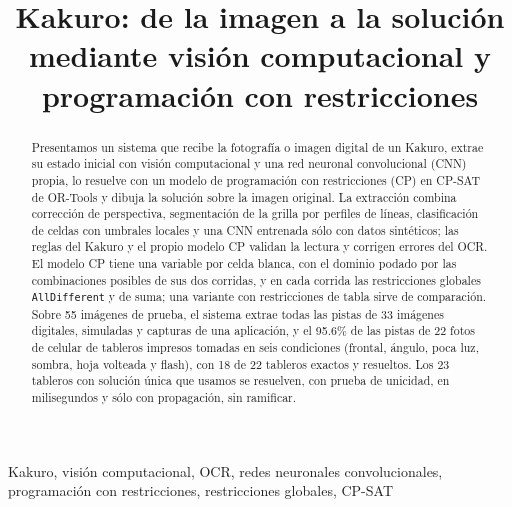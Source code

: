 \documentclass[conference,a4paper]{IEEEtran}
\begin{document}
\title{Kakuro: de la imagen a la solución mediante visión computacional y programación con restricciones}

\author{
}

\maketitle

\begin{abstract}
Presentamos un sistema que recibe la fotografía o imagen digital de un Kakuro, extrae su estado inicial con visión computacional
y una red neuronal convolucional (CNN) propia, lo resuelve con un modelo de programación con restricciones (CP) en CP-SAT de OR-Tools
y dibuja la solución sobre la imagen original. La extracción combina corrección de perspectiva, segmentación de la grilla por perfiles
de líneas, clasificación de celdas con umbrales locales y una CNN entrenada sólo con datos sintéticos; las reglas del Kakuro y el propio
modelo CP validan la lectura y corrigen errores del OCR. El modelo CP tiene una variable por celda blanca, con el dominio podado por las
combinaciones posibles de sus dos corridas, y en cada corrida las restricciones globales \texttt{AllDifferent} y de suma; una variante con
restricciones de tabla sirve de comparación. Sobre 55 imágenes de prueba, el sistema extrae todas las pistas de 33 imágenes digitales,
simuladas y capturas de una aplicación, y el 95.6\% de las pistas de 22 fotos de celular de tableros impresos tomadas en seis condiciones
(frontal, ángulo, poca luz, sombra, hoja volteada y flash), con 18 de 22 tableros exactos y resueltos. Los 23 tableros con solución única
que usamos se resuelven, con prueba de unicidad, en milisegundos y sólo con propagación, sin ramificar.
\end{abstract}

\begin{IEEEkeywords}
Kakuro, visión computacional, OCR, redes neuronales convolucionales, programación con restricciones, restricciones globales, CP-SAT
\end{IEEEkeywords}
\end{document}
